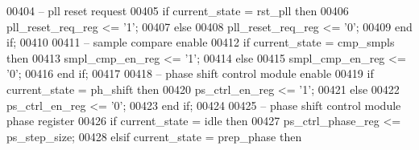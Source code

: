 \begin{DoxyCode}
00404 \textcolor{keyword}{      -- pll reset request}
00405       \textcolor{keywordflow}{if} \textcolor{vhdlchar}{current_state} \textcolor{vhdlchar}{=} \textcolor{vhdlchar}{rst\_pll} \textcolor{keywordflow}{then} 
00406          \textcolor{vhdlchar}{pll_reset_req_reg} \textcolor{vhdlchar}{<=} \textcolor{vhdlchar}{'}\textcolor{vhdllogic}{}\textcolor{vhdllogic}{1}\textcolor{vhdlchar}{'};
00407       \textcolor{keywordflow}{else} 
00408          \textcolor{vhdlchar}{pll_reset_req_reg} \textcolor{vhdlchar}{<=} \textcolor{vhdlchar}{'}\textcolor{vhdllogic}{}\textcolor{vhdllogic}{0}\textcolor{vhdlchar}{'};
00409       \textcolor{keywordflow}{end} \textcolor{keywordflow}{if};
00410       
00411 \textcolor{keyword}{      -- sample compare enable}
00412       \textcolor{keywordflow}{if} \textcolor{vhdlchar}{current_state} \textcolor{vhdlchar}{=} \textcolor{vhdlchar}{cmp\_smpls} \textcolor{keywordflow}{then} 
00413          \textcolor{vhdlchar}{smpl_cmp_en_reg} \textcolor{vhdlchar}{<=} \textcolor{vhdlchar}{'}\textcolor{vhdllogic}{}\textcolor{vhdllogic}{1}\textcolor{vhdlchar}{'};
00414       \textcolor{keywordflow}{else} 
00415          \textcolor{vhdlchar}{smpl_cmp_en_reg} \textcolor{vhdlchar}{<=} \textcolor{vhdlchar}{'}\textcolor{vhdllogic}{}\textcolor{vhdllogic}{0}\textcolor{vhdlchar}{'};
00416       \textcolor{keywordflow}{end} \textcolor{keywordflow}{if};
00417       
00418 \textcolor{keyword}{      -- phase shift control module enable}
00419       \textcolor{keywordflow}{if} \textcolor{vhdlchar}{current_state} \textcolor{vhdlchar}{=} \textcolor{vhdlchar}{ph\_shift} \textcolor{keywordflow}{then} 
00420          \textcolor{vhdlchar}{ps_ctrl_en_reg} \textcolor{vhdlchar}{<=} \textcolor{vhdlchar}{'}\textcolor{vhdllogic}{}\textcolor{vhdllogic}{1}\textcolor{vhdlchar}{'};
00421       \textcolor{keywordflow}{else} 
00422          \textcolor{vhdlchar}{ps_ctrl_en_reg} \textcolor{vhdlchar}{<=} \textcolor{vhdlchar}{'}\textcolor{vhdllogic}{}\textcolor{vhdllogic}{0}\textcolor{vhdlchar}{'};
00423       \textcolor{keywordflow}{end} \textcolor{keywordflow}{if};
00424       
00425 \textcolor{keyword}{      -- phase shift control module phase register}
00426       \textcolor{keywordflow}{if} \textcolor{vhdlchar}{current_state} \textcolor{vhdlchar}{=} \textcolor{vhdlchar}{idle} \textcolor{keywordflow}{then} 
00427          \textcolor{vhdlchar}{ps_ctrl_phase_reg} \textcolor{vhdlchar}{<=} \textcolor{vhdlchar}{ps_step_size};
00428       \textcolor{keywordflow}{elsif} \textcolor{vhdlchar}{current_state} \textcolor{vhdlchar}{=} \textcolor{vhdlchar}{prep\_phase} \textcolor{keywordflow}{then} 

\end{DoxyCode}
